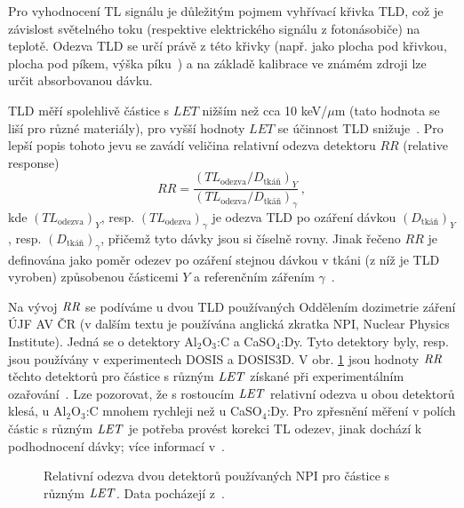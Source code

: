 Pro vyhodnocení TL signálu je důležitým pojmem vyhřívací křivka TLD, což je závislost světelného toku (respektive elektrického signálu z fotonásobiče) na teplotě. Odezva TLD se určí právě z této křivky (např. jako plocha pod křivkou, plocha pod píkem, výška píku~\cite{dosis}) a na základě kalibrace ve známém zdroji lze určit absorbovanou dávku.

TLD měří spolehlivě částice s $\mathit{LET}$ nižším než cca 10 keV/$\mu$m (tato hodnota se liší pro různé materiály), pro vyšší hodnoty $\mathit{LET}$ se účinnost TLD snižuje~\cite{passDetectors}. Pro lepší popis tohoto jevu se zavádí veličina relativní odezva detektoru $\mathit{RR}$ (relative response)
\begin{equation}
  \mathit{RR}=\frac{\left(TL_{\text{odezva}}/D_{\text{tkáň}}\right)_Y}{\left(TL_{\text{odezva}}/D_{\text{tkáň}}\right)_{\gamma}}\,,
  \label{eq:detektory_TLD_RR}
\end{equation}
kde $(TL_{\text{odezva}})_Y$, resp. $(TL_{\text{odezva}})_{\gamma}$ je odezva TLD po ozáření dávkou $(D_{\text{tkáň}})_Y$, resp. $(D_{\text{tkáň}})_{\gamma}$, přičemž tyto dávky jsou si číselně rovny. Jinak řečeno $\mathit{RR}$ je definována jako poměr odezev po ozáření stejnou dávkou v tkáni (z níž je TLD vyroben) způsobenou částicemi $Y$ a referenčním zářením $\gamma$~\cite{TLD_RR}. 

Na vývoj $\mathit{RR}$ se podíváme u dvou TLD používaných Oddělením dozimetrie záření ÚJF AV ČR (v dalším textu je používána anglická zkratka NPI, Nuclear Physics Institute). Jedná se o detektory Al$_2$O$_3$:C a CaSO$_4$:Dy. Tyto detektory byly, resp. jsou používány v experimentech DOSIS a DOSIS3D. V obr. \ref{fig:detektory_TLD_RR} jsou hodnoty $\mathit{RR}$ těchto detektorů pro částice s různým $\mathit{LET}$ získané při experimentálním ozařování~\cite{dataTLD_RR}. Lze pozorovat, že s rostoucím $\mathit{LET}$ relativní odezva u obou detektorů klesá, u Al$_2$O$_3$:C mnohem rychleji než u CaSO$_4$:Dy. Pro zpřesnění měření v polích částic s různým $\mathit{LET}$ je potřeba provést korekci TL odezev, jinak dochází k podhodnocení dávky; více informací v~\cite{TLD_RR}.
\begin{figure}[H]
  \centering
  
  \caption{Relativní odezva dvou detektorů používaných NPI pro částice s různým $\mathit{LET}$. Data pocházejí z~\cite{dataTLD_RR}.}
  \label{fig:detektory_TLD_RR}
\end{figure}
